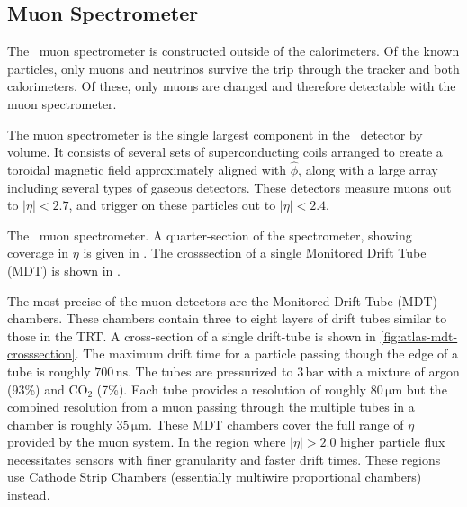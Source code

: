 \subsection{Muon Spectrometer}
\label{sec:atlas-muon}
The \atlas\ muon spectrometer is constructed outside of the calorimeters.
Of the known particles, only muons and neutrinos survive the trip through the tracker and both calorimeters.
Of these, only muons are changed and therefore detectable with the muon spectrometer.

The muon spectrometer is the single largest component in the \atlas\ detector by volume.
It consists of several sets of superconducting coils arranged to create a toroidal magnetic field approximately aligned with $\hat{\phi}$, along with a large array including several types of gaseous detectors.
These detectors measure muons out to $|\eta| < 2.7$, and trigger on these particles out to $|\eta| < 2.4$.

\begin{cfig}
  \caption[\atlas\ muon spectrometer]{The \atlas\ muon spectrometer.
    A quarter-section of the spectrometer, showing coverage in $\eta$ is given in .
    The crosssection of a single Monitored Drift Tube (MDT) is shown in .}
  \label{fig:atlas-muon-spec}
\end{cfig}

The most precise of the muon detectors are the Monitored Drift Tube (MDT) chambers.
These chambers contain three to eight layers of drift tubes similar to those in the TRT.
A cross-section of a single drift-tube is shown in \cref{fig:atlas-mdt-crosssection}.
The maximum drift time for a particle passing though the edge of a tube is roughly $700\,\mathrm{ns}$.
The tubes are pressurized to $3\,\mathrm{bar}$ with a mixture of argon (93\%) and CO$_2$ (7\%).
Each tube provides a resolution of roughly $80\,\mathrm{\mu m}$ but the combined resolution from a muon passing through the multiple tubes in a chamber is roughly $35\,\mathrm{\mu m}$.
These MDT chambers cover the full range of $\eta$ provided by the muon system.
In the region where $|\eta| > 2.0$ higher particle flux necessitates sensors with finer granularity and faster drift times.
These regions use Cathode Strip Chambers (essentially multiwire proportional chambers) instead.

